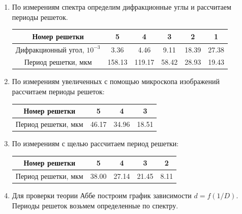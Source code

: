 \documentclass[a4paper, 12pt]{article}
\begin{document}
\begin{enumerate}
    \item По измерениям спектра определим дифракционные углы и рассчитаем периоды решеток.
    
        \begin{tabular}{|c|c|c|c|c|c|} \hline
            Номер решетки & 5 & 4 & 3 & 2 & 1 \\ \hline
            Дифракционный угол, $10^{-3}$ &  3.36 & 4.46 & 9.11 & 18.39 & 27.38 \\ \hline
            Период решетки, мкм & 158.13 & 119.17 & 58.42 & 28.93 & 19.43 \\ \hline
        \end{tabular}

    \item По измерениям увеличенных с помощью микроскопа изображений рассчитаем периоды решеток:
    
        \begin{tabular}{|c|c|c|c|} \hline
            Номер решетки & 5 & 4 & 3 \\ \hline
            Период решетки, мкм & 46.17 & 34.96 & 18.51 \\ \hline
        \end{tabular}

    \item По измерениям с щелью рассчитаем период решетки:
    
        \begin{tabular}{|c|c|c|c|c|} \hline
            Номер решетки & 5 & 4 & 3 & 2 \\ \hline
            Период решетки, мкм & 38.00 & 27.14 & 21.45 & 8.11 \\ \hline
        \end{tabular}

    \item Для проверки теории Аббе построим график зависимости $d = f \left( 1 / D \right)$. Периоды решеток возьмем определенные по спектру.
    

\end{enumerate}
\end{document}
